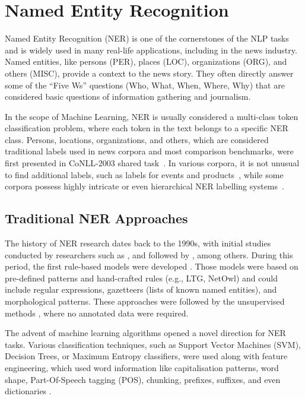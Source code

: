 % 
\chapter{Named Entity Recognition}
\label{ch:ner}

Named Entity Recognition (NER) is one of the cornerstones of the NLP tasks and is widely used in many real-life applications, including in the news industry.
Named entities, like persons (PER), places (LOC), organizations (ORG), and others (MISC), provide a context to the news story. 
They often directly answer some of the ``Five Ws'' questions (Who, What, When, Where, Why) that are considered basic questions of information gathering and journalism.

In the scope of Machine Learning, NER is usually considered a multi-class token classification problem, where each token in the text belongs to a specific NER class.
Persons, locations, organizations, and others, which are considered traditional labels used in news corpora and most comparison benchmarks, were first presented in CoNLL-2003 shared task~\parencite{CoNLL2003}.
In various corpora, it is not unusual to find additional labels, such as labels for events and products~\parencite{piskorski-etal-2017-first}, while some corpora possess highly intricate or even hierarchical NER labelling systems~\parencite{sevickova2007named}.

\section{Traditional NER Approaches}

The history of NER research dates back to the 1990s, with initial studies conducted by researchers such as \textcite{grishman1996message}, and followed by \textcite{sang2003introduction,segura2013semeval}, among others. 
During this period, the first rule-based models were developed \parencite{yu2020named}.
Those models were based on pre-defined patterns and hand-crafted rules (e.g., LTG, NetOwl) and could include regular expressions, gazetteers (lists of known named entities), and morphological patterns.
These approaches were followed by the unsupervised methods \parencite{collins1999unsupervised,nadeau2006unsupervised}, where no annotated data were required. 

The advent of machine learning algorithms opened a novel direction for NER tasks. 
Various classification techniques, such as Support Vector Machines (SVM), Decision Trees, or Maximum Entropy classifiers, were used along with feature engineering, which used word information like capitalisation patterns, word shape, Part-Of-Speech tagging (POS), chunking, prefixes, suffixes, and even dictionaries \parencite{florian2003named,krishnan2006effective}.

